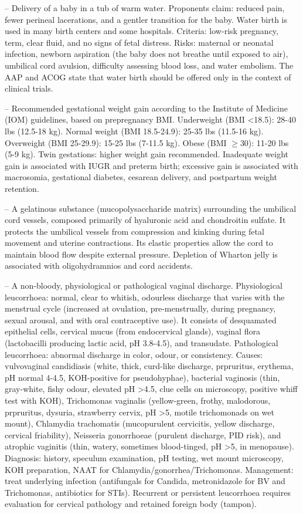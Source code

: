 -- Delivery of a baby in a tub of warm water. Proponents claim: reduced pain, fewer perineal lacerations, and a gentler transition for the baby. Water birth is used in many birth centers and some hospitals. Criteria: low-risk pregnancy, term, clear fluid, and no signs of fetal distress. Risks: maternal or neonatal infection, newborn aspiration (the baby does not breathe until exposed to air), umbilical cord avulsion, difficulty assessing blood loss, and water embolism. The AAP and ACOG state that water birth should be offered only in the context of clinical trials.

-- Recommended gestational weight gain according to the Institute of Medicine (IOM) guidelines, based on prepregnancy BMI. Underweight (BMI <18.5): 28-40 lbs (12.5-18 kg). Normal weight (BMI 18.5-24.9): 25-35 lbs (11.5-16 kg). Overweight (BMI 25-29.9): 15-25 lbs (7-11.5 kg). Obese (BMI \(\ge\)30): 11-20 lbs (5-9 kg). Twin gestations: higher weight gain recommended. Inadequate weight gain is associated with IUGR and preterm birth; excessive gain is associated with macrosomia, gestational diabetes, cesarean delivery, and postpartum weight retention.

-- A gelatinous substance (mucopolysaccharide matrix) surrounding the umbilical cord vessels, composed primarily of hyaluronic acid and chondroitin sulfate. It protects the umbilical vessels from compression and kinking during fetal movement and uterine contractions. Its elastic properties allow the cord to maintain blood flow despite external pressure. Depletion of Wharton jelly is associated with oligohydramnios and cord accidents.

-- A non-bloody, physiological or pathological vaginal discharge. Physiological leucorrhoea: normal, clear to whitish, odourless discharge that varies with the menstrual cycle (increased at ovulation, pre-menstrually, during pregnancy, sexual arousal, and with oral contraceptive use). It consists of desquamated epithelial cells, cervical mucus (from endocervical glands), vaginal flora (lactobacilli producing lactic acid, pH 3.8-4.5), and transudate. Pathological leucorrhoea: abnormal discharge in color, odour, or consistency. Causes: vulvovaginal candidiasis (white, thick, curd-like discharge, prpruritus, erythema, pH normal 4-4.5, KOH-positive for pseudohyphae), bacterial vaginosis (thin, gray-white, fishy odour, elevated pH >4.5, clue cells on microscopy, positive whiff test with KOH), Trichomonas vaginalis (yellow-green, frothy, malodorous, prpruritus, dysuria, strawberry cervix, pH >5, motile trichomonads on wet mount), Chlamydia trachomatis (mucopurulent cervicitis, yellow discharge, cervical friability), Neisseria gonorrhoeae (purulent discharge, PID risk), and atrophic vaginitis (thin, watery, sometimes blood-tinged, pH >5, in menopause). Diagnosis: history, speculum examination, pH testing, wet mount microscopy, KOH preparation, NAAT for Chlamydia/gonorrhea/Trichomonas. Management: treat underlying infection (antifungals for Candida, metronidazole for BV and Trichomonas, antibiotics for STIs). Recurrent or persistent leucorrhoea requires evaluation for cervical pathology and retained foreign body (tampon).

